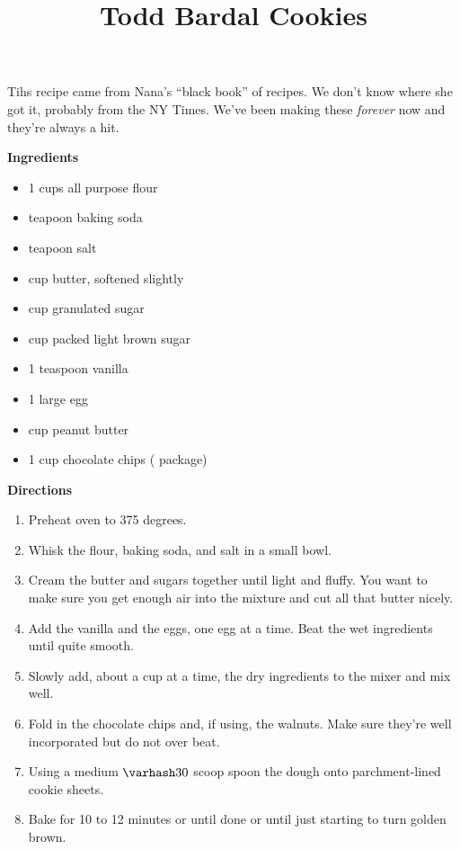 \documentclass{article}
\title{Todd Bardal Cookies}
\begin{document}
Tihs recipe came from Nana's ``black book'' of recipes. We don't know where she got it, probably
from the NY Times. We've been making these \textit{forever} now and they're always a hit.

\textbf{Ingredients}

\begin{multicols}{2}
    \begin{itemize}
        \item 1 cups all purpose flour
        \item {} teapoon baking soda
        \item {} teapoon salt

        \item {} cup butter, softened slightly
        \item {} cup granulated sugar
        \item {} cup packed light brown sugar

        \item 1 teaspoon vanilla
        \item 1 large egg
        \item {} cup peanut butter
        \item 1 cup chocolate chips ( package)
    \end{itemize}
\end{multicols}

\textbf{Directions}

\begin{enumerate}
    \item Preheat oven to 375 degrees.
    \item Whisk the flour, baking soda, and salt in a small bowl.
    \item Cream the butter and sugars together until light and fluffy. You want to make sure you get
          enough air into the mixture and cut all that butter nicely.
    \item Add the vanilla and the eggs, one egg at a time. Beat the wet ingredients until quite smooth.
    \item Slowly add, about a cup at a time, the dry ingredients to the mixer and mix well.
    \item Fold in the chocolate chips and, if using, the walnuts. Make sure they're well
          incorporated but do not over beat.
    \item Using a medium $\varhash 30$ scoop spoon the dough onto parchment-lined cookie sheets.
    \item Bake for 10 to 12 minutes or until done or until just starting to turn golden brown.
\end{enumerate}

\medskip

\end{document}
